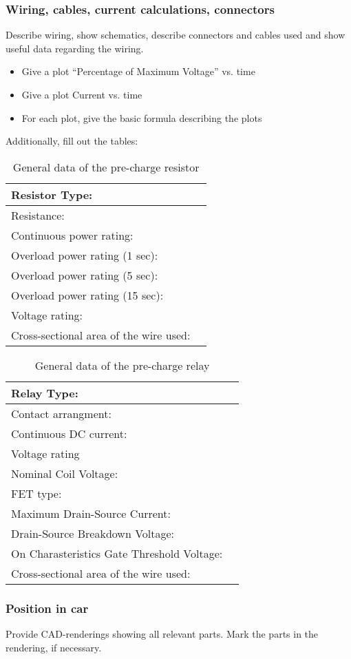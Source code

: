 \subsubsection{Wiring, cables, current calculations, connectors}
Describe wiring, show schematics, describe connectors and cables used and show useful data regarding the wiring.
\begin{itemize}
\item Give a plot “Percentage of Maximum Voltage” vs. time
\item Give a plot Current vs. time 
\item For each plot, give the basic formula describing the plots
\end{itemize}

Additionally, fill out the tables:

\begin{table}[H]
	\centering
	\caption{General data of the pre-charge resistor}
	\begin{tabularx}{\textwidth}{|X|X|}
		\hline
		Resistor Type: & \\[\TableSize]
		\hline
		Resistance: & \\[\TableSize]
		\hline
		Continuous power rating: & \\[\TableSize]
		\hline
		Overload power rating (1 sec): &  \\[\TableSize]
		\hline
		Overload power rating (5 sec): &  \\[\TableSize]
		\hline
		Overload power rating (15 sec): &  \\[\TableSize]
		\hline
		Voltage rating: & \\[\TableSize]
		\hline
		Cross-sectional area of the wire used: & \\[\TableSize]
		\hline
	\end{tabularx}%
	\label{tab:precharge-general}%
\end{table}%

\begin{table}[H]
	\centering
	\caption{General data of the pre-charge relay}
	\begin{tabularx}{\textwidth}{|X|X|}
		\hline
		Relay Type: & \\[\TableSize]
		\hline
		Contact arrangment: &  \\[\TableSize]
		\hline
		Continuous DC current:  & \\[\TableSize]
		\hline
		Voltage rating  & \\[\TableSize]
		\hline
		Nominal Coil Voltage: &  \\[\TableSize]
		\hline
		FET type: &  \\[\TableSize]
		\hline
		Maximum Drain-Source Current: &  \\[\TableSize]
		\hline
		Drain-Source Breakdown Voltage: &  \\[\TableSize]
		\hline
		On Charasteristics Gate Threshold Voltage: & \\[\TableSize]
		\hline
		Cross-sectional area of the wire used: & \\[\TableSize]
		\hline
	\end{tabularx}%
	\label{tab:precharge-relay}%
\end{table}%

\subsubsection{Position in car}
Provide CAD-renderings showing all relevant parts. Mark the parts in the rendering, if necessary.